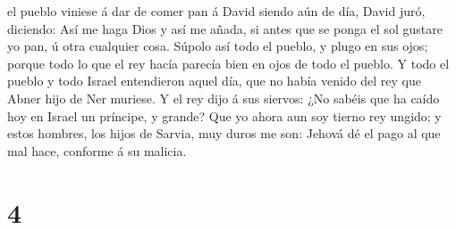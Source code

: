 el pueblo viniese á dar de comer pan á David siendo aún de día, David
juró, diciendo: Así me haga Dios y así me añada, si antes que se ponga
el sol gustare yo pan, ú otra cualquier cosa.  Súpolo así
todo el pueblo, y plugo en sus ojos; porque todo lo que el rey hacía
parecía bien en ojos de todo el pueblo.  Y todo el pueblo
y todo Israel entendieron aquel día, que no había venido del rey que
Abner hijo de Ner muriese.  Y el rey dijo á sus siervos:
¿No sabéis que ha caído hoy en Israel un príncipe, y grande?
 Que yo ahora aun soy tierno rey ungido; y estos hombres,
los hijos de Sarvia, muy duros me son: Jehová dé el pago al que mal
hace, conforme á su malicia.

\hypertarget{section-3}{%
\section{4}\label{section-3}}

